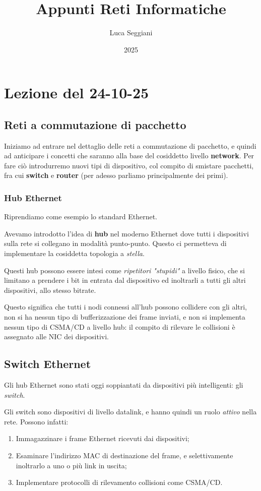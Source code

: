 \documentclass[a4paper,11pt]{article}
\title{Appunti Reti Informatiche}
\author{Luca Seggiani}
\date{2025}
\begin{document}
\section{Lezione del 24-10-25}

\thispagestyle{empty}
\pagestyle{fancy}

\subsection{Reti a commutazione di pacchetto}
Iniziamo ad entrare nel dettaglio delle reti a commutazione di pacchetto, e quindi ad anticipare i concetti che saranno alla base del cosiddetto livello \textbf{network}.
Per fare ciò introdurremo nuovi tipi di dispositivo, col compito di smistare pacchetti, fra cui \textbf{switch} e \textbf{router} (per adesso parliamo principalmente dei primi).

\subsubsection{Hub Ethernet}
Riprendiamo come esempio lo standard Ethernet.

Avevamo introdotto l'idea di \textbf{hub} nel moderno Ethernet dove tutti i dispositivi sulla rete si collegano in modalità punto-punto. Questo ci permetteva di implementare la cosiddetta topologia a \textit{stella}.

Questi hub possono essere intesi come \textit{ripetitori "stupidi"} a livello fisico, che si limitano a prendere i bit in entrata dal dispositivo ed inoltrarli a tutti gli altri dispositivi, allo stesso bitrate.

Questo significa che tutti i nodi connessi all'hub possono collidere con gli altri, non si ha nessun tipo di bufferizzazione dei frame inviati, e non si implementa nessun tipo di CSMA/CD a livello hub: il compito di rilevare le collisioni è assegnato alle NIC dei dispositivi.

\subsection{Switch Ethernet}
Gli hub Ethernet sono stati oggi soppiantati da dispositivi più intelligenti: gli \textit{switch}. 

Gli switch sono dispositivi di livello datalink, e hanno quindi un ruolo \textit{attivo} nella rete.
Possono infatti:
\begin{enumerate}
	\item Immagazzinare i frame Ethernet ricevuti dai dispositivi;
	\item Esaminare l'indirizzo MAC di destinazione del frame, e selettivamente inoltrarlo a uno o più link in uscita;
	\item Implementare protocolli di rilevamento collisioni come CSMA/CD.
\end{enumerate}
\end{document}
